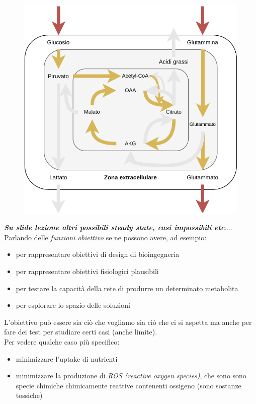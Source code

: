 \documentclass[a4paper,12pt, oneside]{book}
\begin{document}
\begin{figure}[H]
  \centering
  \includegraphics[scale = 0.8]{img/toy4.pdf}
\end{figure}
\textbf{\textit{Su slide lezione altri possibili steady state, casi impossibili
    etc$\ldots$}}.\\
Parlando delle \textit{funzioni obiettivo} se ne possono avere, ad esempio:
\begin{itemize}
  \item per rappresentare obiettivi di design di bioingegneria
  \item per rappresentare obiettivi fisiologici plausibili
  \item per testare la capacità della rete di produrre un determinato metabolita
  \item per esplorare lo spazio delle soluzioni
\end{itemize}
L'obiettivo può essere sia ciò che vogliamo sia ciò che ci si aspetta ma anche
per fare dei test per studiare certi casi (anche limite).\\
Per vedere qualche caso più specifico:
\begin{itemize}
  \item minimizzare l'uptake di nutrienti
  \item minimizzare la produzione di \textit{ROS (reactive oxygen species)}, che
  sono sono specie chimiche chimicamente reattive contenenti ossigeno (sono
  sostanze tossiche)
\end{itemize}
\end{document}
